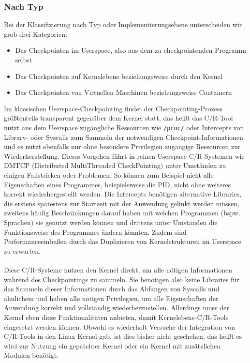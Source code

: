 \documentclass[a4paper]{article}
\begin{document}
\subsubsection{Nach Typ}
Bei der Klassifizierung nach Typ oder Implementierungsebene unterscheiden wir grob drei Kategorien: 
\begin{itemize}
    \item Das Checkpointen im Userspace, also aus dem zu checkpointenden Programm selbst
    \item Das Checkpointen auf Kernelebene beziehungsweise durch den Kernel
    \item Das Checkpointen von Virtuellen Maschinen beziehungsweise Containern
\end{itemize}
Im klassischen Userspace-Checkpointing findet der Checkpointing-Prozess größtenteils transparent gegenüber dem Kernel statt, das heißt das C/R-Tool nutzt aus dem Userspace zugängliche Ressourcen wie \texttt{/proc/} oder Intercepts von Library- oder Syscalls zum Sammeln der notwendigen Checkpoint-Informationen und es nutzt ebenfalls nur ohne besondere Privilegien zugängige Ressourcen zur Wiederherstellung. 
Dieses Vorgehen führt in reinen Userspace-C/R-Systemen wie DMTCP\cite{dmtcp} (Distributed MultiThreaded CheckPointing) unter Umständen zu einigen Fallstricken oder Problemen. 
So können zum Beispiel nicht alle Eigenschaften eines Programmes, beispielsweise die PID, nicht ohne weiteres korrekt wiederhergestellt werden. 
Die Intercepts benötigen alternative Libraries, die erstens spätestens zur Startzeit mit der Anwendung gelinkt werden müssen, zweitens häufig Beschränkungen darauf haben mit welchen Programmen (bspw. Sprachen) sie genutzt werden können und drittens unter Umständen die Funktionsweise des Programmes ändern könnten. Zudem sind Performanceeinbußen durch das Duplizieren von Kernelstrukturen im Userspace zu erwarten.\\ \\
Diese C/R-Systeme nutzen den Kernel direkt, um alle nötigen Informationen während des Checkpointings zu sammeln. 
Sie benötigen also keine Libraries für das Sammeln dieser Informationen durch das Abfangen von Syscalls und ähnlichem und haben alle nötigen Privilegien, um alle Eigenschaften der Anwendung korrekt und vollständig wiederherzustellen. 
Allerdings muss der Kernel eben diese Funktionalitäten anbieten, damit Kernelebene-C/R-Tools eingesetzt werden können. Obwohl es wiederholt Versuche der Integration von C/R-Tools in den Linux Kernel gab, ist dies bisher nicht geschehen, das heißt es wird zur Nutzung ein gepatchter Kernel oder ein Kernel mit zusätzlichen Modulen benötigt.\\
\end{document}
